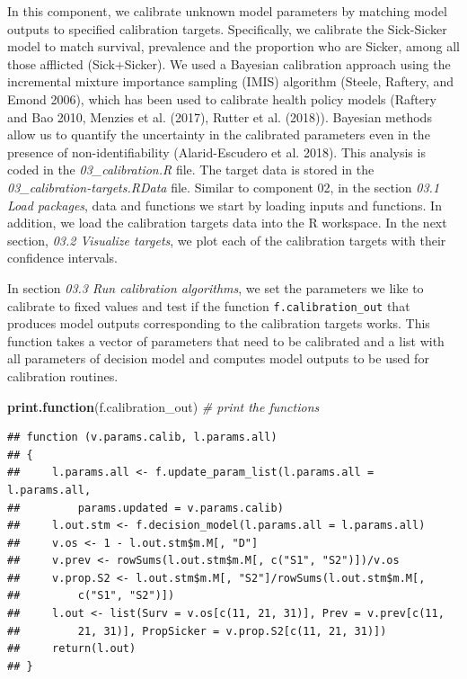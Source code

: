 \documentclass[]{article}
\newenvironment{Shaded}{\begin{snugshade}}{\end{snugshade}}
\newcommand{\KeywordTok}[1]{\textcolor[rgb]{0.13,0.29,0.53}{\textbf{#1}}}
\newcommand{\CommentTok}[1]{\textcolor[rgb]{0.56,0.35,0.01}{\textit{#1}}}
\newcommand{\NormalTok}[1]{#1}
\begin{document}
In this component, we calibrate unknown model parameters by matching
model outputs to specified calibration targets. Specifically, we
calibrate the Sick-Sicker model to match survival, prevalence and the
proportion who are Sicker, among all those afflicted (Sick+Sicker). We
used a Bayesian calibration approach using the incremental mixture
importance sampling (IMIS) algorithm (Steele, Raftery, and Emond 2006),
which has been used to calibrate health policy models (Raftery and Bao
2010, Menzies et al. (2017), Rutter et al. (2018)). Bayesian methods
allow us to quantify the uncertainty in the calibrated parameters even
in the presence of non-identifiability (Alarid-Escudero et al. 2018).
This analysis is coded in the \emph{03\_calibration.R} file. The target
data is stored in the \emph{03\_calibration-targets.RData} file. Similar
to component 02, in the section \emph{03.1 Load packages}, data and
functions we start by loading inputs and functions. In addition, we load
the calibration targets data into the R workspace. In the next section,
\emph{03.2 Visualize targets}, we plot each of the calibration targets
with their confidence intervals.

In section \emph{03.3 Run calibration algorithms}, we set the parameters
we like to calibrate to fixed values and test if the function
\texttt{f.calibration\_out} that produces model outputs corresponding to
the calibration targets works. This function takes a vector of
parameters that need to be calibrated and a list with all parameters of
decision model and computes model outputs to be used for calibration
routines.

\begin{Shaded}
\begin{Highlighting}[]
\KeywordTok{print.function}\NormalTok{(f.calibration_out) }\CommentTok{# print the functions}
\end{Highlighting}
\end{Shaded}

\begin{verbatim}
## function (v.params.calib, l.params.all) 
## {
##     l.params.all <- f.update_param_list(l.params.all = l.params.all, 
##         params.updated = v.params.calib)
##     l.out.stm <- f.decision_model(l.params.all = l.params.all)
##     v.os <- 1 - l.out.stm$m.M[, "D"]
##     v.prev <- rowSums(l.out.stm$m.M[, c("S1", "S2")])/v.os
##     v.prop.S2 <- l.out.stm$m.M[, "S2"]/rowSums(l.out.stm$m.M[, 
##         c("S1", "S2")])
##     l.out <- list(Surv = v.os[c(11, 21, 31)], Prev = v.prev[c(11, 
##         21, 31)], PropSicker = v.prop.S2[c(11, 21, 31)])
##     return(l.out)
## }
\end{verbatim}
\end{document}
